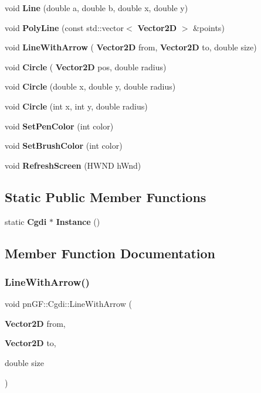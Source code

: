 \begin{DoxyCompactItemize}
\mbox{\label{classpn_g_f_1_1_cgdi_a9d1fc7b4fc3d1aaab58cf32eb8b60eb7}} 
void {\bfseries Line} (double a, double b, double x, double y)
\item 
\mbox{\label{classpn_g_f_1_1_cgdi_aae27cf8c2aae44a11e20af455aa0dfc7}} 
void {\bfseries Poly\+Line} (const std\+::vector$<$ \textbf{ Vector2D} $>$ \&points)
\item 
void \textbf{ Line\+With\+Arrow} (\textbf{ Vector2D} from, \textbf{ Vector2D} to, double size)
\item 
\mbox{\label{classpn_g_f_1_1_cgdi_a36f1e8d90d46e7d21277f6c55857854d}} 
void {\bfseries Circle} (\textbf{ Vector2D} pos, double radius)
\item 
\mbox{\label{classpn_g_f_1_1_cgdi_a692bf0fe3733bcc4d24a13ceb4f8df96}} 
void {\bfseries Circle} (double x, double y, double radius)
\item 
\mbox{\label{classpn_g_f_1_1_cgdi_a6d160436ed6c9d745fc0e05048edda13}} 
void {\bfseries Circle} (int x, int y, double radius)
\item 
\mbox{\label{classpn_g_f_1_1_cgdi_a50edef89221793ccb6079774deda23cc}} 
void {\bfseries Set\+Pen\+Color} (int color)
\item 
\mbox{\label{classpn_g_f_1_1_cgdi_a90906ec1e9cb03b84df31f12b65e80fc}} 
void {\bfseries Set\+Brush\+Color} (int color)
\item 
\mbox{\label{classpn_g_f_1_1_cgdi_aa4edf7aacc5a3c567676c8e75bde9308}} 
void {\bfseries Refresh\+Screen} (H\+W\+ND h\+Wnd)
\end{DoxyCompactItemize}
\subsection*{Static Public Member Functions}
\begin{DoxyCompactItemize}
\item 
\mbox{\label{classpn_g_f_1_1_cgdi_a997cacfe78a268cbee00150a2e128f03}} 
static \textbf{ Cgdi} $\ast$ {\bfseries Instance} ()
\end{DoxyCompactItemize}


\subsection{Member Function Documentation}
\mbox{\label{classpn_g_f_1_1_cgdi_abf81d8153532db6042f32a0995d86d3d}} 
\subsubsection{Line\+With\+Arrow()}
{\footnotesize\ttfamily void pn\+G\+F\+::\+Cgdi\+::\+Line\+With\+Arrow (\begin{DoxyParamCaption}\item[{\textbf{ Vector2D}}]{from,  }\item[{\textbf{ Vector2D}}]{to,  }\item[{double}]{size }\end{DoxyParamCaption})\hspace{0.3cm}{\ttfamily [inline]}}



